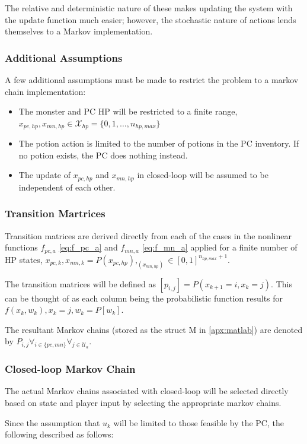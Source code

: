 \documentclass[letterpaper, 10 pt, conference]{ieeeconf}
\begin{document}
The relative and deterministic nature of these makes updating the system with the update function much easier;
 however, the stochastic nature of actions lends themselves to a Markov implementation.
\subsubsection{Additional Assumptions}
A few additional assumptions must be made to restrict the problem to a markov chain implementation:
\begin{itemize}
    \item The monster and PC HP will be restricted to a finite range, $x_{pc,hp},x_{mn,hp} \in \mathcal{X}_{hp} = \{0,1,\dots, n_{hp,max}\}$
    \item The potion action is limited to the number of potions in the PC inventory. If no potion exists, the PC does nothing instead.
    \item The update of $x_{pc,hp}$ and $x_{mn,hp}$ in closed-loop will be assumed to be independent of each other.
\end{itemize}

\subsubsection{Transition Martrices}\label{sec:transition_matrices}
Transition matrices are derived directly from each of the cases in the nonlinear functions $f_{pc,a}$ \eqref{eq:f_pc_a} and $f_{mn,a}$ \eqref{eq:f_mn_a} applied for a finite number of HP states, $x_{pc,k}, x_{mn,k} = P(x_{pc,hp}), _(x_{mn,hp}) \in [0,1]^{n_{hp,max}+1}$.

The transition matrices will be defined as $[p_{i,j}] = P(x_{k+1} = i, x_{k} = j)$.
This can be thought of as each column being the probabilistic function results for $f(x_k,w_k), x_{k} = j, w_k = P[w_k]$.

The resultant Markov chains (stored as the struct M in \autoref{apx:matlab}) are denoted by $P_{i,j} \forall_{i\in\{pc,mn\}} \forall_{j\in \mathcal{U}_a}$.
\subsubsection{Closed-loop Markov Chain}
The actual Markov chains associated with closed-loop will be selected directly based on state and player input by selecting the appropriate markov chains.

Since the assumption that $u_k$ will be limited to those feasible by the PC, the following described as follows:
\end{document}
